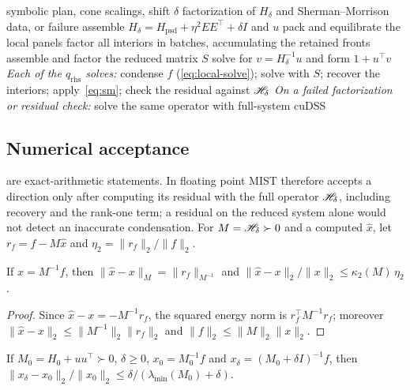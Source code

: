 \begin{algorithm}[htbp]
\caption{Numerical phase (once per IPM iteration)}\label{alg:factor}
\small
\begin{algorithmic}[1]
\Require symbolic plan, cone scalings, shift $\delta$
\Ensure factorization of $H_\delta$ and Sherman--Morrison data, or failure
\State assemble $H_\delta=H_{\mathrm{psd}}+\eta^2EE^\top+\delta I$ and $u$
\State pack and equilibrate the local panels
\State factor all interiors in batches, accumulating the retained fronts
\State assemble and factor the reduced matrix $S$
\State solve for $v=H_\delta^{-1}u$ and form $1+u^\top v$
\Statex \emph{Each of the $q_{\mathrm{rhs}}$ solves:} condense $f$ (\eqref{eq:local-solve});
solve with $S$; recover the interiors; apply~\eqref{eq:sm}; check the residual
against $\mathscr H_\delta$
\Statex \emph{On a failed factorization or residual check:} solve the same operator with
full-system cuDSS
\end{algorithmic}
\end{algorithm}

\subsection{Numerical acceptance}\label{sec:acceptance}

 are exact-arithmetic statements. In floating point MIST
therefore accepts a direction only after computing its residual with the full
operator $\mathscr H_\delta$, including recovery and the rank-one term; a residual on the
reduced system alone would not detect an inaccurate condensation. For
$M=\mathscr H_\delta\succ0$ and a computed $\widehat x$, let $r_f=f-M\widehat x$ and
$\eta_2=\|r_f\|_2/\|f\|_2$.

\begin{proposition}\label{prop:residual}
If $x=M^{-1}f$, then $\|\widehat x-x\|_M=\|r_f\|_{M^{-1}}$ and
$\|\widehat x-x\|_2/\|x\|_2\le\kappa_2(M)\,\eta_2$.
\end{proposition}

\begin{proof}
Since $\widehat x-x=-M^{-1}r_f$, the squared energy norm is $r_f^\top M^{-1}r_f$;
moreover $\|\widehat x-x\|_2\le\|M^{-1}\|_2\|r_f\|_2$ and $\|f\|_2\le\|M\|_2\|x\|_2$.
\end{proof}

\begin{proposition}\label{prop:shift}
If $M_0=H_0+uu^\top\succ0$, $\delta\ge0$, $x_0=M_0^{-1}f$ and
$x_\delta=(M_0+\delta I)^{-1}f$, then
$\|x_\delta-x_0\|_2/\|x_0\|_2\le\delta/(\lambda_{\min}(M_0)+\delta)$.
\end{proposition}

